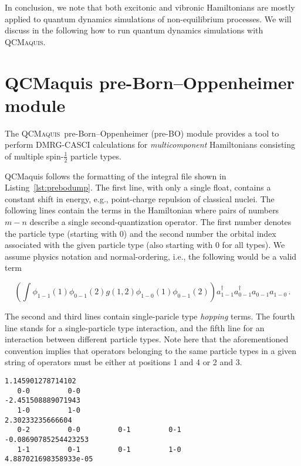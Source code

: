 \documentclass[bibliography=totoc,12pt,a4paper]{scrartcl}
\newcommand{\qcm}{\textsc{QCMaquis}}
\begin{document}
In conclusion, we note that both excitonic and vibronic Hamiltonians are mostly applied to quantum dynamics simulations of non-equilibrium processes.
We will discuss in the following how to run quantum dynamics simulations with \qcm.

\section{QCMaquis pre-Born--Oppenheimer module}
\label{sec:preBO}

The \qcm\ pre-Born--Oppenheimer (pre-BO) module provides a tool to perform DMRG-CASCI calculations for \textit{multicomponent} Hamiltonians consisting of multiple spin-$\frac12$ particle types.

QCMaquis follows the formatting of the integral file shown in Listing~\ref{lst:prebodump}.
The first line, with only a single float, contains a constant shift in energy, e.g., point-charge repulsion of classical nuclei.
The following lines contain the terms in the Hamiltonian where pairs of numbers $m-n$ describe a single second-quantization operator.
The first number denotes the particle type (starting with 0) and the second number the orbital index associated with the given particle type (also starting with 0 for all types).
We assume physics notation and normal-ordering, i.e., the following would be a valid term

\begin{equation}
  \left(\int \phi_{1-1}(1)\phi_{0-1}(2)g(1,2)\phi_{1-0}(1)\phi_{0-1}(2)\right)
  a^\dagger_{1-1} a^\dagger_{0-1} a_{0-1} a_{1-0}\,.
\end{equation}

The second and third lines contain single-paricle type \textit{hopping} terms.
The fourth line stands for a single-particle type interaction, and the fifth
line for an interaction between different particle types. 
Note here that the aforementioned convention implies that operators belonging to
the same particle types in a given string of operators must be either at
positions 1 and 4 or 2 and 3. 

\begin{lstlisting}[language=qcmaquis,caption={Pre-BO integral file
format.},label=lst:prebodump]
1.145901278714102                       
   0-0         0-0                                      -2.451508889071943
   1-0         1-0                                      2.30233235666604
   0-2         0-0         0-1         0-1              -0.08690785254423253
   1-1         0-1         0-1         1-0              4.887021698358933e-05
\end{lstlisting}
\end{document}
